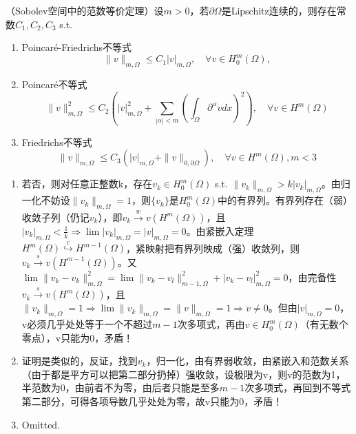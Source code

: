 \begin{thm}
  （Sobolev空间中的范数等价定理）设$m > 0$，若$\partial \Omega$是Lipschitz连续的，则存在常数$C_{1}, C_{2}, C_{3}$ s.t. 
  \begin{enumerate}
    \item Poincaré-Friedrichs不等式
    \[
      \|v\|_{m, \Omega} \le C_{1}|v|_{m, \Omega}, \quad \forall v \in H_{0}^{m}(\Omega),
    \]

    \item Poincaré不等式
    \[
      \|v\|_{m, \Omega}^{2} \le C_{2}\left(|v|_{m, \Omega}^{2}+\sum_{|\alpha|<m}\left(\int_{\Omega} \partial^{\alpha} v dx\right)^{2}\right), \quad \forall v \in H^{m}(\Omega)
    \]

    \item Friedrichs不等式
    \[
      \|v\|_{m, \Omega} \le C_{3}\left(|v|_{m, \Omega}+\|v\|_{0, \partial \Omega}\right), \quad \forall v \in H^{m}(\Omega), m < 3
    \]
  \end{enumerate}
\end{thm}

\begin{pf}
  \begin{enumerate}
    \item 若否，则对任意正整数k，存在$v_k \in H_0^m(\Omega)$ s.t. $\|v_k\|_{m, \Omega} > k |v_k|_{m, \Omega}$。由归一化不妨设$\|v_k\|_{m, \Omega} = 1$，则$\{v_k\}$是$H_0^m(\Omega)$中的有界列。有界列存在（弱）收敛子列（仍记$v_k$），即$v_k \overset{w}{\to} v (H^m(\Omega))$，且$|v_k|_{m, \Omega} < \frac{1}{k} \Rightarrow \lim |v_k|_{m, \Omega} = |v|_{m, \Omega} = 0$。由紧嵌入定理$H^m(\Omega) \overset{c}{\hookrightarrow} H^{m - 1}(\Omega)$，紧映射把有界列映成（强）收敛列，则$v_{k} \overset{s}{\to} v (H^{m - 1}(\Omega))$。又$\lim \|v_k - v_k\|_{m, \Omega}^2 = \lim \|v_k - v_l\|_{m - 1, \Omega}^2 + |v_k - v_l|_{m, \Omega}^2 = 0$，由完备性$v_{k} \overset{s}{\to} v (H^{m}(\Omega))$，且$\|v_k\|_{m, \Omega} = 1 \Rightarrow \lim \|v_k\|_{m, \Omega} = \|v\|_{m, \Omega} = 1 \Rightarrow v \neq 0$。但由$|v|_{m, \Omega} = 0$，v必须几乎处处等于一个不超过$m - 1$次多项式，再由$v \in H_0^m(\Omega)$（有无数个零点），v只能为0，矛盾！
    \item 证明是类似的，反证，找到$v_k$，归一化，由有界弱收敛，由紧嵌入和范数关系（由于都是平方可以把第二部分扔掉）强收敛，设极限为v，则v的范数为1，半范数为0，由前者不为零，由后者只能是至多$m - 1$次多项式，再回到不等式第二部分，可得各项导数几乎处处为零，故v只能为0，矛盾！
    \item Omitted.
  \end{enumerate}
\end{pf}

